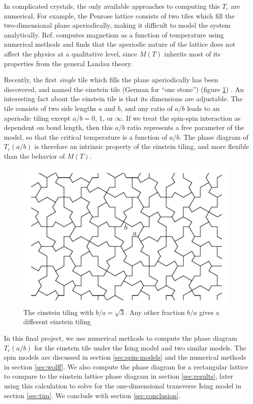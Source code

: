 \documentclass[
  amsmath,
  amssymb,
  aps,
  twocolumn,
  nofootinbib,
  nolongbibliography,
  floatfix,
]{revtex4-2}
\begin{document}
In complicated crystals, the only available approaches to computing this $T_c$ are numerical. For example, the Penrose lattice consists of two tiles which fill the two-dimensional plane aperiodically, making it difficult to model the system analytically. Ref. \cite{penrose-ising} computes magnetism as a function of temperature using numerical methods and finds that the aperiodic nature of the lattice does not affect the physics at a qualitative level, since $M(T)$ inherits most of its properties from the general Landau theory.

Recently, the first \textit{single} tile which fills the plane aperiodically has been discovered, and named the einstein tile (German for ``one stone'') (figure \ref{fig:einstein}) \cite{smith2023aperiodic}. An interesting fact about the einstein tile is that its dimensions are adjustable. The tile consists of two side lengths $a$ and $b$, and any ratio of $a/b$ leads to an aperiodic tiling except $a/b=0$, 1, or $\infty$. If we treat the spin-spin interaction as dependent on bond length, then this $a/b$ ratio represents a free parameter of the model, so that the critical temperature is a function of $a/b$. The phase diagram of $T_c(a/b)$ is therefore an intrinsic property of the einstein tiling, and more flexible than the behavior of $M(T)$.

\begin{figure}
  \centering
  \includegraphics[width=\linewidth]{../figs/einstein.pdf}
  \caption{The einstein tiling with $b/a=\sqrt{3}$. Any other fraction $b/a$ gives a different einstein tiling}
  \label{fig:einstein}
\end{figure}

In this final project, we use numerical methods to compute the phase diagram $T_c(a/b)$ for the einstein tile under the Ising model and two similar models. The spin models are discussed in section \ref{sec:spin-models} and the numerical methods in section \ref{sec:wolff}. We also compute the phase diagram for a rectangular lattice to compare to the einstein lattice phase diagram in section \ref{sec:results}, later using this calculation to solve for the one-dimensional transverse Ising model in section \ref{sec:tim}. We conclude with section \ref{sec:conclusion}.
\end{document}
